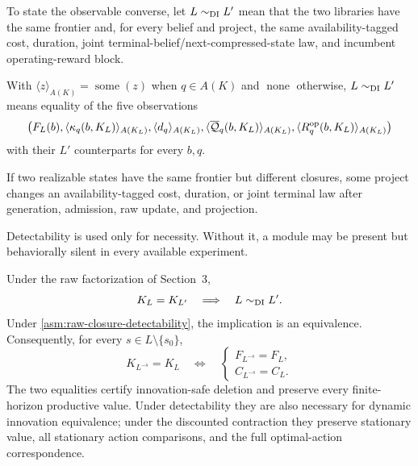 To state the observable converse, let \(L\sim_{\mathrm{DI}}L'\) mean that the two
libraries have the same frontier and, for every belief and project, the same
availability-tagged cost, duration, joint terminal-belief/next-compressed-state
law, and incumbent operating-reward block.
\begin{definition}
\label{def:dynamic-innovation-equivalence}
With \(\langle z\rangle_{A(K)}=\operatorname{some}(z)\) when \(q\in A(K)\)
and \(\operatorname{none}\) otherwise, \(L\sim_{\mathrm{DI}}L'\) means equality of
the five observations
\begin{equation}\label{eq:di-definition}
 \left(F_L(b),
 \langle\kappa_q(b,K_L)\rangle_{A(K_L)},
 \langle d_q\rangle_{A(K_L)},
 \langle\overline{\mathcal Q}_q(b,K_L)\rangle_{A(K_L)},
 \langle R_q^{\mathrm{op}}(b,K_L)\rangle_{A(K_L)}\right)
\end{equation}
with their \(L'\) counterparts for every \(b,q\).
\end{definition}

\begin{assumption}
\label{asm:raw-closure-detectability}
If two realizable states have the same frontier but different closures, some
project changes an availability-tagged cost, duration, or joint terminal law
after generation, admission, raw update, and projection.
\end{assumption}

Detectability is used only for necessity.  Without it, a module may be
present but behaviorally silent in every available experiment.

\begin{theorem}
\label{thm:raw-frontier-closure-characterization}
\label{thm:unified-safe-deletion}
Under the raw factorization of Section~3,
\[
 K_L=K_{L'}\quad\Longrightarrow\quad L\sim_{\mathrm{DI}}L'.
\]
Under \cref{asm:raw-closure-detectability}, the implication is an
equivalence.  Consequently, for every \(s\in L\setminus\{s_0\}\),
\begin{equation}\label{eq:t3-state}
 K_{L^{-s}}=K_L
 \quad\Longleftrightarrow\quad
 \left\{
 \begin{array}{l}
 F_{L^{-s}}=F_L,\\[-2pt]
 C_{L^{-s}}=C_L.
 \end{array}\right.
\end{equation}
The two equalities certify innovation-safe deletion and preserve every
finite-horizon productive value.  Under detectability they are also necessary
for dynamic innovation equivalence; under the discounted contraction they
preserve stationary value, all stationary action comparisons, and the full
optimal-action correspondence.
\end{theorem}

